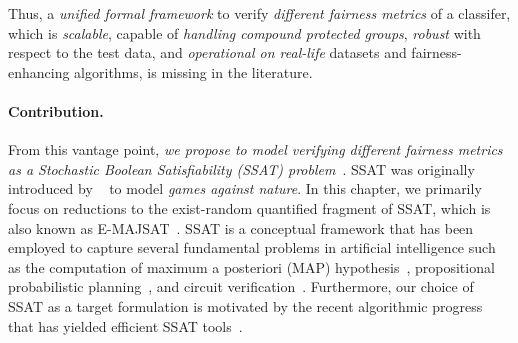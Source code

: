 Thus, a \textit{unified formal framework} to verify \textit{different fairness metrics} of a classifer, which is \textit{scalable}, capable of \textit{handling compound protected groups}, \textit{robust} with respect to the test data, and \textit{operational on real-life} datasets and fairness-enhancing algorithms, is missing in the literature.

\paragraph{Contribution.} From this vantage point, \textit{we propose to model verifying different fairness metrics as a Stochastic Boolean Satisfiability (SSAT) problem}~\cite{littman2001stochastic}. SSAT was originally introduced by ~\cite{papadimitriou1985games} to model {\em games against nature}. In this chapter, we primarily focus on reductions to the exist-random quantified fragment of SSAT, which is also known as E-MAJSAT~\cite{littman2001stochastic}.   SSAT is a conceptual framework that has been employed to capture several fundamental problems in artificial intelligence such as the computation of maximum a posteriori (MAP) hypothesis~\cite{fremont2017maximum},  propositional probabilistic planning~\cite{majercik2007appssat},  and circuit verification~\cite{lee2018towards}. Furthermore, our choice of SSAT as a target formulation is motivated by the recent algorithmic progress that has yielded efficient SSAT tools~\cite{lee2017solving,lee2018solving}.




